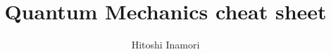 \newcommand{\toshRightBlock}[1]	{$\left[{#1}\right.$}
\newcommand{\toshDef}[1]				{{\textbf{#1}}}
\newcommand{\toshEquivalent}		{$\iff$}
\newcommand{\toshImply}					{\Rightarrow}
\newcommand{\toshByDef}					{$\stackrel{D}{\iff}$}
\newcommand{\toshEqByDef}				{\,\stackrel{D}{=}\,}
\newcommand{\toshIdentity}			{{\mathbf{1}}}
\newcommand{\toshItoInt}				{{\mathcal{I}}}
\newcommand{\toshB}							{{\mathcal{B}}\,}
\newcommand{\toshC}							{{\mathbf{C}}}
\newcommand{\toshCylinder}			{{\mathcal{C}}_1}
\newcommand{\toshF}							{{\mathcal{F}}\,}
\newcommand{\toshG}							{{\mathcal{G}}\,}
\newcommand{\toshH}							{{\mathcal{H}}\,}
\newcommand{\toshL}							{{\mathcal{L}}}
\newcommand{\toshLOne}					{{\mathcal{L}}^1}
\newcommand{\toshM}							{{\mathcal{M}}\,}
\newcommand{\toshMStep}					{M^2_{{step}}}
\newcommand{\toshMTwo}					{M^2}					
\newcommand{\toshN}							{{\mathbf{N}}\,}
\newcommand{\toshNuST}					{{\nu^{m\times n}_{\toshH}(S,T)}}
\newcommand{\toshST}						{\,/\,} %
\newcommand{\toshR}							{{\mathbf{R}}}
\newcommand{\toshT}							{{\mathbf{T}}}
\newcommand{\toshVar}						{{\textrm{Var}}}

\newcommand{\state}[1]{\left|{#1}\right>}
\newcommand{\stateBasis}[2]{\left|{#1}\right>_{#2}}
\newcommand{\bra}[1]{\left<{#1}\right|}
\newcommand{\braBasis}[2]{\left<{#1}\right|_{#2}}
\newcommand{\braket}[2]{\left<{#1}|{#2}\right>}
\newcommand{\Tr}[1]{\textrm{Tr}\left({#1}\right)}
\newcommand{\PartTr}[2]{\textrm{Tr}_{#2}\left({#1}\right)}



\title{Quantum Mechanics cheat sheet}
\author{Hitoshi Inamori}
\maketitle


